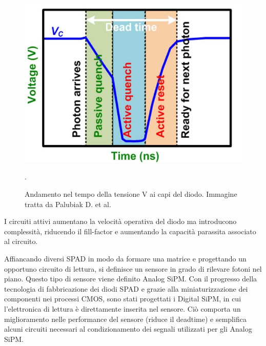 \begin{figure}[tbh]
	\centering
	\includegraphics[width=0.6\linewidth]{./ImageFiles/aqr_2.jpg}
	\caption{Andamento nel tempo della tensione V ai capi del diodo. Immagine tratta da Palubiak D. et al. \cite{Palubiak2011}}. 
	\label{fig:aqr_2}
\end{figure} 
I circuiti attivi aumentano la velocità operativa del diodo ma introducono complessità, riducendo il fill-factor e aumentando la capacità parassita associato al circuito.

Affiancando diversi SPAD in modo da formare una matrice e progettando un opportuno circuito di lettura, si definisce un sensore in grado di rilevare fotoni nel piano. Questo tipo di sensore viene definito Analog SiPM. Con il progresso della tecnologia di fabbricazione dei diodi SPAD e grazie alla miniaturizzazione dei componenti nei processi CMOS, sono stati progettati i Digital SiPM, in cui l'elettronica di lettura è direttamente inserita nel sensore. Ciò comporta un miglioramento nelle performance del sensore (riduce il deadtime) e semplifica alcuni circuiti necessari al condizionamento dei segnali utilizzati per gli Analog SiPM.

\clearpage
